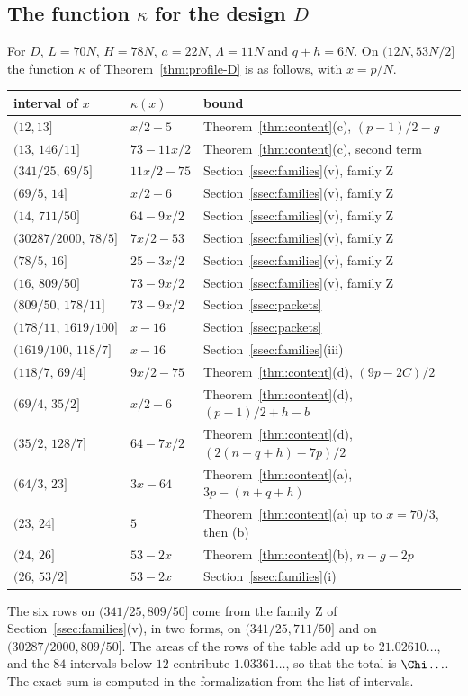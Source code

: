 \subsection{The function $\kappa$ for the design $D$}\label{ssec:kappa}
For $D$, $L=70N$, $H=78N$, $a=22N$, $\Lambda=11N$ and $q+h=6N$. On $(12N,53N/2]$ the function $\kappa$ of
Theorem~\ref{thm:profile-D} is as follows, with $x=p/N$.
\begin{center}
\begin{tabular}{@{}lll@{}}
\toprule
interval of $x$ & $\kappa(x)$ & bound \\
\midrule
$(12,13]$ & $x/2-5$ & Theorem~\ref{thm:content}(c), $(p-1)/2-g$ \\
$(13,\,146/11]$ & $73-11x/2$ & Theorem~\ref{thm:content}(c), second term \\
$(341/25,\,69/5]$ & $11x/2-75$ & Section~\ref{ssec:families}(v), family Z \\
$(69/5,\,14]$ & $x/2-6$ & Section~\ref{ssec:families}(v), family Z \\
$(14,\,711/50]$ & $64-9x/2$ & Section~\ref{ssec:families}(v), family Z \\
$(30287/2000,\,78/5]$ & $7x/2-53$ & Section~\ref{ssec:families}(v), family Z \\
$(78/5,\,16]$ & $25-3x/2$ & Section~\ref{ssec:families}(v), family Z \\
$(16,\,809/50]$ & $73-9x/2$ & Section~\ref{ssec:families}(v), family Z \\
$(809/50,\,178/11]$ & $73-9x/2$ & Section~\ref{ssec:packets} \\
$(178/11,\,1619/100]$ & $x-16$ & Section~\ref{ssec:packets} \\
$(1619/100,\,118/7]$ & $x-16$ & Section~\ref{ssec:families}(iii) \\
$(118/7,\,69/4]$ & $9x/2-75$ & Theorem~\ref{thm:content}(d), $(9p-2C)/2$ \\
$(69/4,\,35/2]$ & $x/2-6$ & Theorem~\ref{thm:content}(d), $(p-1)/2+h-b$ \\
$(35/2,\,128/7]$ & $64-7x/2$ & Theorem~\ref{thm:content}(d), $(2(n+q+h)-7p)/2$ \\
$(64/3,\,23]$ & $3x-64$ & Theorem~\ref{thm:content}(a), $3p-(n+q+h)$ \\
$(23,\,24]$ & $5$ & Theorem~\ref{thm:content}(a) up to $x=70/3$, then (b) \\
$(24,\,26]$ & $53-2x$ & Theorem~\ref{thm:content}(b), $n-g-2p$ \\
$(26,\,53/2]$ & $53-2x$ & Section~\ref{ssec:families}(i) \\
\bottomrule
\end{tabular}
\end{center}
The six rows on $(341/25,809/50]$ come from the family Z of Section~\ref{ssec:families}(v), in two forms, on
$(341/25,711/50]$ and on $(30287/2000,809/50]$. The areas of the rows of the table add up to $21.02610\ldots$,
and the $84$ intervals below $12$ contribute $1.03361\ldots$, so that
the total is $\Chi\ldots$. The exact sum is computed in the formalization from the list of intervals.

